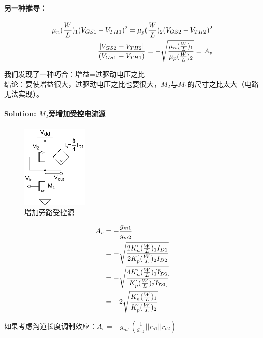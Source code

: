 \documentclass[twoside,a4paper,openright,titlepage,draft]{ctexrep}
\begin{document}
\paragraph{另一种推导：}
\begin{align}
    \mu_n(\frac{W}{L})_1(V_{GS1}-V_{TH1})^2 = \mu_p(\frac{W}{L})_2(V_{GS2}-V_{TH2})^2 \notag \\
    \frac{|V_{GS2}-V_{TH2}|}{(V_{GS1}-V_{TH1})} = 
    -\sqrt{\frac{\mu_n (\frac{W}{L})_1}{\mu_p (\frac{W}{L})_2}} = A_v
\end{align}
\par
我们发现了一种巧合：增益=过驱动电压之比 \\

结论：要使增益很大，过驱动电压之比也要很大，$M_2$与$M_1$的尺寸之比太大（电路无法实现）。\\
\par

\paragraph{Solution: $M_2$旁增加受控电流源} 
\par
\begin{multicols}{2}
    \begin{figure}[H]
        \centering
        \includegraphics[height=40mm]{diode-connectedbypass.eps}
        \caption{增加旁路受控源}
        \label{fig:增加旁路受控源}
    \end{figure}
    \columnbreak
    \begin{align}
        A_v &= -\frac{g_{m1}}{g_{m2}} \notag \\
        &= -\sqrt{\frac{2K^{'}_n(\frac{W}{L})_1I_{D1}}{2K^{'}_p(\frac{W}{L})_2I_{D2}}} \notag \\
        &= -\sqrt{\frac{4K^{'}_n(\frac{W}{L})_1\bcancel{I_{D1}}}{K^{'}_p(\frac{W}{L})_2\bcancel{I_{D2}}}}\notag\\
        &= -2\sqrt{\frac{K^{'}_n(\frac{W}{L})_1}{K^{'}_p(\frac{W}{L})_2}}
    \end{align} 
\end{multicols}
如果考虑沟道长度调制效应：$A_v = -g_{m1}(\frac{1}{g_{m2}}||r_{o1}||r_{o2})$
\end{document}
